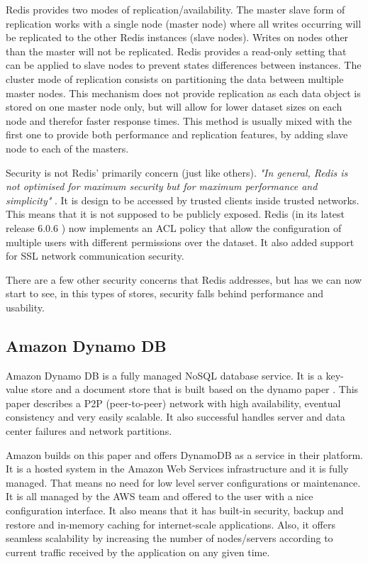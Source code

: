 Redis provides two modes of replication/availability. The master slave form of replication works with a single node (master node) where all writes occurring will be replicated to the other Redis instances (slave nodes). Writes on nodes other than the master will not be replicated. Redis provides a read-only setting that can be applied to slave nodes to prevent states differences between instances. The cluster mode of replication consists on partitioning the data between multiple master nodes. This mechanism does not provide replication as each data object is stored on one master node only, but will allow for lower dataset sizes on each node and therefor faster response times. This method is usually mixed with the first one to provide both performance and replication features, by adding slave node to each of the masters.

Security is not Redis' primarily concern (just like others). \textit{"In general, Redis is not optimised for maximum security but for maximum performance and simplicity"} \cite{redis:4}. It is design to be accessed by trusted clients inside trusted networks. This means that it is not supposed to be publicly exposed. Redis (in its latest release 6.0.6 \cite{redis:5}) now implements an \gls{ACL} policy that allow the configuration of multiple users with different permissions over the dataset. It also added support for \gls{SSL} network communication security.

There are a few other security concerns that Redis addresses, but has we can now start to see, in this types of stores, security falls behind performance and usability.

\subsection{Amazon Dynamo DB}
\label{ssec:amazon_dynamo_db}

Amazon Dynamo DB \cite{dynamo:1} is a fully managed NoSQL database service. It is a key-value store and a document store that is built based on the dynamo paper \cite{dynamo:2}. This paper describes a \gls{P2P} (peer-to-peer) network with high availability, eventual consistency and very easily scalable. It also successful handles server and data center failures and network partitions.

Amazon builds on this paper and offers DynamoDB as a service in their platform. It is a hosted system in the Amazon Web Services \cite{aws:1} infrastructure and it is fully managed. That means no need for low level server configurations or maintenance. It is all managed by the \gls{AWS} team and offered to the user with a nice configuration interface. It also means that it has built-in security, backup and restore and in-memory caching for internet-scale applications. Also, it offers seamless scalability by increasing the number of nodes/servers according to current traffic received by the application on any given time. 

